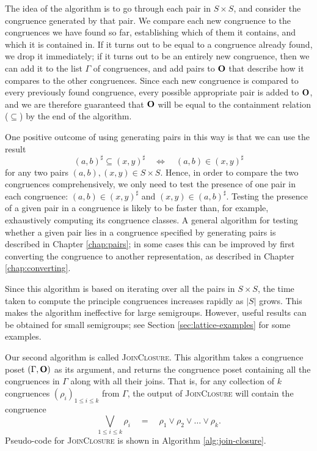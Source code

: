 The idea of the algorithm is to go through each pair in $S \times S$, and
consider the congruence generated by that pair.  We compare each new congruence
to the congruences we have found so far, establishing which of them it contains,
and which it is contained in.  If it turns out to be equal to a congruence
already found, we drop it immediately; if it turns out to be an entirely new
congruence, then we can add it to the list $\Gamma$ of congruences, and add
pairs to $\mathbf{O}$ that describe how it compares to the other congruences.  Since
each new congruence is compared to every previously found congruence, every
possible appropriate pair is added to $\mathbf{O}$, and we are therefore guaranteed
that $\mathbf{O}$ will be equal to the containment relation ($\subseteq$) by the end of
the algorithm.

One positive outcome of using generating pairs in this way is that we can use
the result
$$(a,b)^\sharp \subseteq (x,y)^\sharp \quad\iff\quad (a,b) \in (x,y)^\sharp$$
for any two pairs $(a,b), (x,y) \in S \times S$.  Hence, in order to compare the
two congruences comprehensively, we only need to test the presence of one pair
in each congruence: $(a,b) \in (x,y)^\sharp$ and $(x,y) \in (a,b)^\sharp$.
Testing the presence of a given pair in a congruence is likely to be faster
than, for example, exhaustively computing its congruence classes.  A general
algorithm for testing whether a given pair lies in a congruence specified by
generating pairs is described in Chapter \ref{chap:pairs}; in some cases this
can be improved by first converting the congruence to another representation, as
described in Chapter \ref{chap:converting}.

Since this algorithm is based on iterating over all the pairs in $S \times S$,
the time taken to compute the principle congruences increases rapidly as $|S|$
grows.  This makes the algorithm ineffective for large semigroups.  However,
useful results can be obtained for small semigroups; see Section
\ref{sec:lattice-examples} for some examples.

Our second algorithm is called \textsc{JoinClosure}.  This algorithm takes a
congruence poset $(\Gamma, \mathbf{O})$ as its argument, and returns the congruence
poset containing all the congruences in $\Gamma$ along with all their joins.
That is, for any collection of $k$ congruences
$(\rho_i)_{1 \leq i \leq k}$ from $\Gamma$, the output of
\textsc{JoinClosure} will contain the congruence
$$\bigvee_{1 \leq i \leq k} \rho_i
\quad=\quad \rho_1 \vee \rho_2 \vee \ldots \vee \rho_k.$$
Pseudo-code for \textsc{JoinClosure} is shown in Algorithm
\ref{alg:join-closure}.

